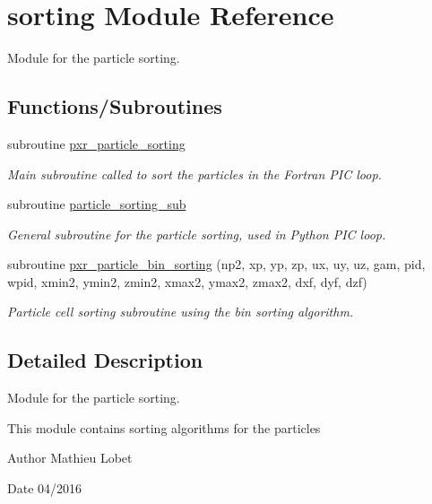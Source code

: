 \hypertarget{namespacesorting}{}\section{sorting Module Reference}
\label{namespacesorting}


Module for the particle sorting.  


\subsection*{Functions/\+Subroutines}
\begin{DoxyCompactItemize}
\item 
subroutine \hyperlink{namespacesorting_a87a0a7dcccbf50dc52ec0f6d03892df0}{pxr\+\_\+particle\+\_\+sorting}
\begin{DoxyCompactList}\small\item\em Main subroutine called to sort the particles in the Fortran P\+IC loop. \end{DoxyCompactList}\item 
subroutine \hyperlink{namespacesorting_a1aa6cb1a11b013d93cabdee6bf4910d9}{particle\+\_\+sorting\+\_\+sub}
\begin{DoxyCompactList}\small\item\em General subroutine for the particle sorting, used in Python P\+IC loop. \end{DoxyCompactList}\item 
subroutine \hyperlink{namespacesorting_ab1b6f85a226345de94537dc63205a182}{pxr\+\_\+particle\+\_\+bin\+\_\+sorting} (np2, xp, yp, zp, ux, uy, uz, gam, pid, wpid,                                       xmin2, ymin2, zmin2, xmax2, ymax2, zmax2, dxf, dyf, dzf)
\begin{DoxyCompactList}\small\item\em Particle cell sorting subroutine using the bin sorting algorithm. \end{DoxyCompactList}\end{DoxyCompactItemize}


\subsection{Detailed Description}
Module for the particle sorting. 

This module contains sorting algorithms for the particles

\begin{DoxyAuthor}{Author}
Mathieu Lobet
\end{DoxyAuthor}
\begin{DoxyDate}{Date}
04/2016 
\end{DoxyDate}


